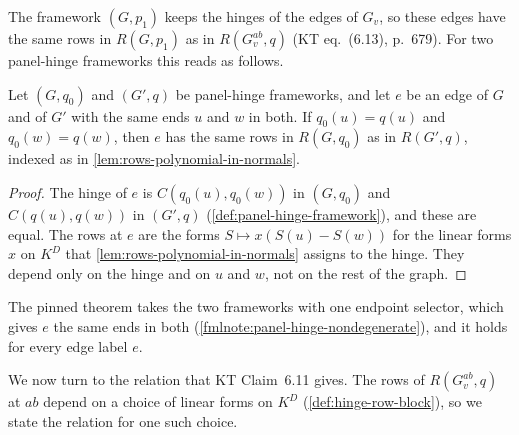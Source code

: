 The framework $(G, p_1)$ keeps the hinges of the edges of $G_v$, so
these edges have the same rows in $R(G, p_1)$ as in $R(G_v^{ab}, q)$ (KT
eq.~(6.13), p.~679). For two panel-hinge frameworks this reads as
follows.

\begin{lemma}
  \label{lem:case-III-seam}
  \leanok
  Let $(G, q_0)$ and $(G', q)$ be panel-hinge frameworks, and let $e$ be
  an edge of $G$ and of $G'$ with the same ends $u$ and $w$ in both. If
  $q_0(u) = q(u)$ and $q_0(w) = q(w)$, then $e$ has the same rows in
  $R(G, q_0)$ as in $R(G', q)$, indexed as in
  \cref{lem:rows-polynomial-in-normals}.
\end{lemma}
\begin{proof}
  \leanok
  The hinge of $e$ is $C(q_0(u), q_0(w))$ in $(G, q_0)$ and
  $C(q(u), q(w))$ in $(G', q)$ (\cref{def:panel-hinge-framework}), and
  these are equal. The rows at $e$ are the forms
  $S \mapsto x(S(u) - S(w))$ for the linear forms $x$ on $K^D$ that
  \cref{lem:rows-polynomial-in-normals} assigns to the hinge. They depend
  only on the hinge and on $u$ and $w$, not on the rest of the graph.
\end{proof}

\begin{fmlnote}
  The pinned theorem takes the two frameworks with one endpoint
  selector, which gives $e$ the same ends in both
  (\cref{fmlnote:panel-hinge-nondegenerate}), and it holds for every
  edge label $e$.
\end{fmlnote}

We now turn to the relation that KT Claim~6.11 gives. The rows of
$R(G_v^{ab}, q)$ at $ab$ depend on a choice of linear forms on $K^D$
(\cref{def:hinge-row-block}), so we state the relation for one such
choice.

